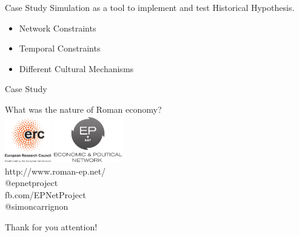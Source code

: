 \documentclass[12pt, handout=show,notes=show]{beamer}
\begin{document}
\begin{frame}{Case Study}
	Simulation as a tool to implement and test Historical Hypothesis.
	\begin{itemize}
	\item Network Constraints
	\item Temporal Constraints
	\item Different Cultural Mechanisms
	\end{itemize}
\end{frame}
\begin{frame}{Case Study}
	\begin{center}
		\Large
		What was the nature of Roman economy?\\
		\includegraphics[width=2cm]{images/LOGO-ERC.jpg} \hfil	\includegraphics[width=3cm]{images/epnetLogo.png}\\
		\vspace{1cm}
		\scriptsize
			http://www.roman-ep.net/\\
			@epnetproject\\
			fb.com/EPNetProject\\
			@simoncarrignon
	\end{center}


\end{frame}

\begin{frame}
    \Huge
    Thank for you attention!
\end{frame}
\end{document}
